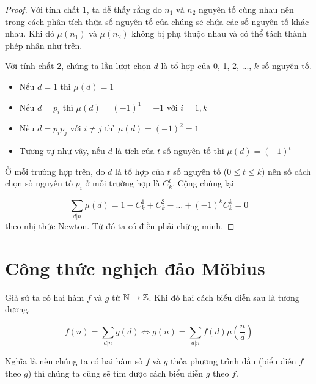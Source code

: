\begin{proof}
    Với tính chất 1, ta dễ thấy rằng do $n_1$ và $n_2$ nguyên tố cùng nhau nên trong
    cách phân tích thừa số nguyên tố của chúng sẽ chứa các số nguyên tố khác nhau. 
    Khi đó $\mu(n_1)$ và $\mu(n_2)$ không bị phụ thuộc nhau và có thể tách thành phép
    nhân như trên.

    Với tính chất 2, chúng ta lần lượt chọn $d$ là tổ hợp của 0, 1, 2, ..., $k$
    số nguyên tố.

    \begin{itemize}
        \item Nếu $d = 1$ thì $\mu(d) = 1$
        \item Nếu $d = p_i$ thì $\mu(d) = (-1)^1 = -1$ với $i = \overline{1, k}$
        \item Nếu $d = p_i p_j$ với $i \neq j$ thì $\mu (d) = (-1)^2 = 1$
        \item Tương tự như vậy, nếu $d$ là tích của $t$ số nguyên tố thì
        $\mu (d) = (-1)^t$
    \end{itemize}

    Ở mỗi trường hợp trên, do $d$ là tổ hợp của $t$ số nguyên tố ($0 \leq t \leq k$)
    nên số cách chọn số nguyên tố $p_i$ ở mỗi trường hợp là $C^t_k$. Cộng chúng lại

    \[\sum_{d \vert n} \mu(d) = 1 - C^1_k + C^2_k - \ldots + (-1)^k C^k_k = 0\]
    theo nhị thức Newton. Từ đó ta có điều phải chứng minh.
\end{proof}

\section{Công thức nghịch đảo \foreignlanguage{german}{Möbius}}

Giả sử ta có hai hàm $f$ và $g$ từ $\mathbb{N} \to \mathbb{Z}$. Khi đó hai cách biểu diễn sau
là tương đương.

\begin{equation}
    f(n) = \sum_{d \vert n} g(d) \Leftrightarrow g(n) 
    = \sum_{d \vert n} f(d) \mu(\frac{n}{d})
\end{equation}

Nghĩa là nếu chúng ta có hai hàm số $f$ và $g$ thỏa phương trình đầu (biểu diễn
$f$ theo $g$) thì chúng ta cũng sẽ tìm được cách biểu diễn $g$ theo $f$.

